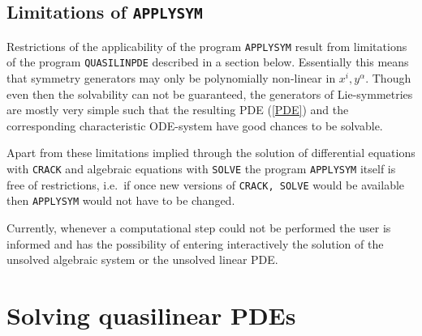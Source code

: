 \subsection{Limitations of {\tt APPLYSYM}}
Restrictions of the applicability of the program {\tt APPLYSYM} result
from limitations of the program {\tt QUASILINPDE} described in a section below.
Essentially this means that symmetry generators may only be polynomially
non-linear in $x^i, y^\alpha$.
Though even then the solvability can not be guaranteed, the
generators of Lie-symmetries are mostly very simple such that the
resulting PDE (\ref{PDE}) and the corresponding characteristic
ODE-system have good chances to be solvable.

Apart from these limitations implied through the solution of differential
equations with {\tt CRACK} and algebraic equations with {\tt SOLVE}
the program {\tt APPLYSYM} itself is free of restrictions,
i.e.\ if once new versions of {\tt CRACK, SOLVE}
would be available then {\tt APPLYSYM} would not have to be changed.

Currently, whenever a computational step could not be performed
the user is informed and has the possibility of entering interactively
the solution of the unsolved algebraic system or the unsolved linear PDE.
\section{Solving quasilinear PDEs}
